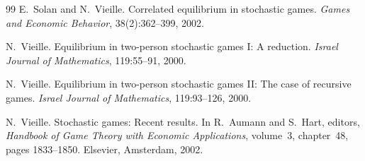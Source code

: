 \documentclass[12pt]{article}
\theoremstyle{definition}
\newcommand{\1}{\mathbf{1}}
\begin{document}
\begin{thebibliography}{99}
E.~Solan and N.~Vieille.
\newblock Correlated equilibrium in stochastic games.
\newblock \emph{Games and Economic Behavior}, 38(2):362--399, 2002.

N.~Vieille.
\newblock Equilibrium in two-person stochastic games {I}: A reduction.
\newblock \emph{Israel Journal of Mathematics}, 119:55--91, 2000.

N.~Vieille.
\newblock Equilibrium in two-person stochastic games {II}: The case of recursive
games.
\newblock \emph{Israel Journal of Mathematics}, 119:93--126, 2000.

N.~Vieille.
\newblock Stochastic games: Recent results.
\newblock In R.~Aumann and S.~Hart, editors, \emph{Handbook of Game Theory with
Economic Applications}, volume~3, chapter~48, pages 1833--1850. Elsevier,
Amsterdam, 2002.

\end{thebibliography}
\end{document}
